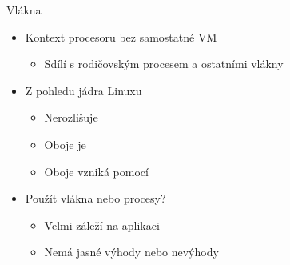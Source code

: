 
\begin{frame}{Vlákna}

  \begin{itemize}
    \item Kontext procesoru bez samostatné VM
    \begin{itemize}
      \item Sdílí s rodičovským procesem a ostatními vlákny
    \end{itemize}

    \pause

    \item Z pohledu jádra Linuxu
    \begin{itemize}
      \item Nerozlišuje
      \item Oboje je 
      \item Oboje vzniká pomocí 
    \end{itemize}

    \pause

    \item Použít vlákna nebo procesy?
    \begin{itemize}
      \item Velmi záleží na aplikaci
      \item Nemá jasné výhody nebo nevýhody
    \end{itemize}
  \end{itemize}

\end{frame}

